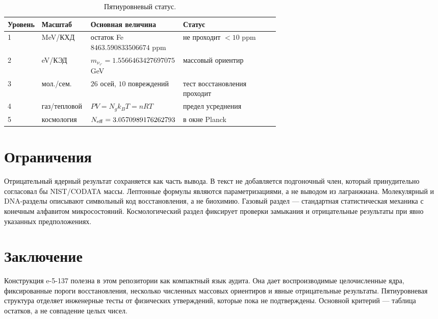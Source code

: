 \documentclass[11pt]{article}
\begin{document}
\begin{table}[h]
\centering
\caption{Пятиуровневый статус.}
\small
\setlength{\tabcolsep}{3pt}
\begin{tabularx}{\linewidth}{@{}P{0.10\linewidth}P{0.18\linewidth}P{0.34\linewidth}Y@{}}
\toprule
Уровень & Масштаб & Основная величина & Статус \\
 & MeV/КХД & остаток Fe $8463.590833506674$ ppm & не проходит $<10$ ppm \\
2 & eV/КЭД & $m_{\nu_{\tau'}}=1.5566463427697075$ GeV & массовый ориентир \\
3 & мол./сем. & $26$ осей, $10$ повреждений & тест восстановления проходит \\
4 & газ/тепловой & $PV=N_gk_BT=nRT$ & предел усреднения \\
5 & космология & $N_{\rm eff}=3.0570989176262793$ & в окне Planck \\
\bottomrule
\end{tabularx}
\end{table}

\section{Ограничения}

Отрицательный ядерный результат сохраняется как часть вывода.  В текст не
добавляется подгоночный член, который принудительно согласовал бы NIST/CODATA
массы.  Лептонные формулы являются параметризациями, а не выводом из
лагранжиана.  Молекулярный и DNA-разделы описывают символьный код
восстановления, а не биохимию.  Газовый раздел — стандартная статистическая
механика с конечным алфавитом микросостояний.  Космологический раздел
фиксирует проверки замыкания и отрицательные результаты при явно указанных
предположениях.

\section{Заключение}

Конструкция e-5-137 полезна в этом репозитории как компактный язык
аудита.  Она дает воспроизводимые целочисленные ядра, фиксированные пороги
восстановления, несколько численных массовых ориентиров и явные отрицательные
результаты.  Пятиуровневая структура отделяет инженерные тесты от физических
утверждений, которые пока не подтверждены.  Основной критерий — таблица
остатков, а не совпадение целых чисел.
\end{document}
